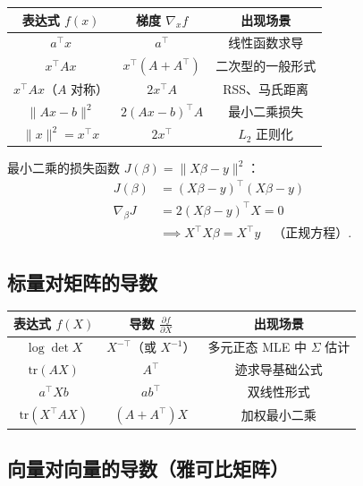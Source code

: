 \begin{center}
\renewcommand{\arraystretch}{1.8}
\begin{tabular}{c|c|c}
\toprule
\textbf{表达式 $f(x)$} & \textbf{梯度 $\nabla_x f$} & \textbf{出现场景} \\
\midrule
$a^\top x$ & $a^\top$ & 线性函数求导 \\
$x^\top A x$ & $x^\top (A + A^\top)$ & 二次型的一般形式 \\
$x^\top A x$（$A$ 对称） & $2x^\top A$ & RSS、马氏距离 \\
$\|Ax - b\|^2$ & $2(Ax - b)^\top A$ & 最小二乘损失 \\
$\|x\|^2 = x^\top x$ & $2x^\top$ & $L_2$ 正则化 \\
\bottomrule
\end{tabular}
\end{center}

\begin{example}
最小二乘的损失函数 $J(\beta) = \|X\beta - y\|^2$：
\begin{align}
    J(\beta) &= (X\beta - y)^\top (X\beta - y) \nonumber\\
    \nabla_\beta J &= 2(X\beta - y)^\top X = 0 \nonumber\\
    &\implies X^\top X \beta = X^\top y \quad \text{（正规方程）}.
\end{align}
\end{example}

\subsection{标量对矩阵的导数}

\begin{center}
\renewcommand{\arraystretch}{1.8}
\begin{tabular}{c|c|c}
\toprule
\textbf{表达式 $f(X)$} & \textbf{导数 $\frac{\partial f}{\partial X}$} & \textbf{出现场景} \\
\midrule
$\log\det X$ & $X^{-\top}$（或 $X^{-1}$） & 多元正态 MLE 中 $\Sigma$ 估计 \\
$\mathrm{tr}(AX)$ & $A^\top$ & 迹求导基础公式 \\
$a^\top X b$ & $a b^\top$ & 双线性形式 \\
$\mathrm{tr}(X^\top A X)$ & $(A + A^\top)X$ & 加权最小二乘 \\
\bottomrule
\end{tabular}
\end{center}

\subsection{向量对向量的导数（雅可比矩阵）}

